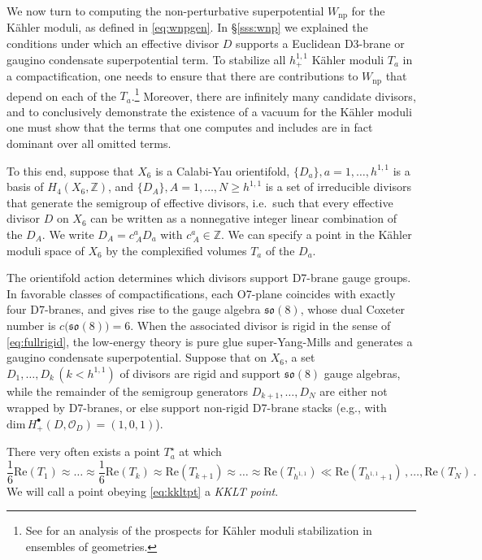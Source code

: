 \documentclass[12pt,a4wide]{article}
\begin{document}
We now turn to computing the non-perturbative superpotential $W_{\text{np}}$ for the K\"ahler moduli, as defined in \eqref{eq:wnpgen}.
In \S\ref{sss:wnp} we explained the conditions under which an effective divisor $D$ supports a Euclidean D3-brane or gaugino condensate superpotential term.  
To stabilize all $h^{1,1}_+$ K\"ahler moduli $T_a$ in a compactification,  one needs to ensure that there are contributions to $W_{\text{np}}$ that depend on each of the $T_a$.\footnote{See 
\cite{Halverson:2019vmd} for an analysis of the prospects for K\"ahler moduli stabilization in ensembles of geometries.}
Moreover, there are infinitely many candidate divisors, and to conclusively demonstrate the existence of a vacuum for the K\"ahler moduli one must show that the terms that one computes and includes are in fact dominant over all omitted terms.

To this end, suppose that $X_6$ is a Calabi-Yau orientifold, $\{D_a\}, a=1,\ldots, h^{1,1}$
is a basis of $H_4(X_6,\mathbb{Z})$,
and $\{D_A\}, A=1,\ldots, N \ge h^{1,1}$
is a set of irreducible divisors that generate the semigroup of effective divisors, i.e.~such that every effective divisor $D$ on $X_6$ can be written as a nonnegative integer linear combination of the $D_A$.  We write $D_A = c^a_{~A} D_a$ with $c^a_{~A} \in \mathbb{Z}$.
We can specify a point in the K\"ahler moduli space of $X_6$ by the complexified volumes $T_a$ of the $D_a$.  

The orientifold action determines which divisors support D7-brane gauge groups.  In favorable classes of compactifications, each O7-plane coincides with exactly four D7-branes, and gives rise to the gauge algebra $\mathfrak{so}(8)$, whose dual Coxeter number is 
 $c\bigl(\mathfrak{so}(8)\bigr)=6$.
When the associated divisor is rigid in the sense of \eqref{eq:fullrigid}, the low-energy theory is pure glue super-Yang-Mills and generates a gaugino condensate superpotential.
Suppose that on $X_6$, a set $D_1,\ldots, D_{k}\,(k<h^{1,1})$ of divisors are rigid and support  $\mathfrak{so}(8)$ gauge algebras, while the remainder of the semigroup generators
$D_{k+1},\ldots, D_{N}$ are either not wrapped by D7-branes, or else support non-rigid D7-brane stacks (e.g., with $\text{dim}\, H_+^{\bullet}(D,\mathcal{O}_D)=(1,0,1)$).

There very often exists a point  $T_a^{\star}$ at which
\begin{equation} \label{eq:kkltpt}
   \frac{1}{6}\text{Re}(T_1) \approx   \ldots \approx 
   \frac{1}{6}\text{Re}(T_k) \approx \text{Re}(T_{k+1}) \approx \ldots \approx \text{Re}(T_{h^{1,1}}) \ll \text{Re}(T_{h^{1,1}+1})\,,   \ldots, \text{Re}(T_{N})\,.
\end{equation} 
We will call a point obeying \eqref{eq:kkltpt} a \emph{KKLT point}.
\end{document}
